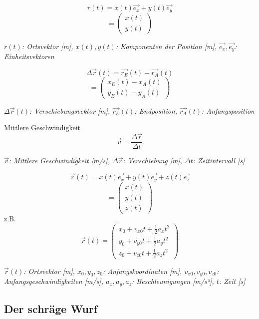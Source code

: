 \documentclass[a4paper,10pt]{article}
\newenvironment{displayformula}
{
	\begin{framed}
		\color{formulaColor}
	}
	{\end{framed}}
\newcommand{\formulalegend}[1]{%
	\par\vspace{0.5ex}%
	{{\color{legendColor}\RaggedRight\small\textit{#1}}}%
	\par\vspace{1.5ex}%
}
\begin{document}
\begin{displayformula}
	\[
	r(t) = x(t)\vec{e_x} + y(t)\vec{e_y}
	\]
	\[
	= \begin{pmatrix}
		x(t) \\
		y(t)
	\end{pmatrix}
	\]
\end{displayformula}
\formulalegend{
	\( r(t) \): Ortsvektor [m], \( x(t), y(t) \): Komponenten der Position [m], \( \vec{e_x}, \vec{e_y} \): Einheitsvektoren
}

\begin{displayformula}
	\[
	\Delta \vec{r}(t) = \vec{r_E}(t) - \vec{r_A}(t)
	\]
	\[
	= \begin{pmatrix}
		x_E(t) - x_A(t) \\
		y_E(t) - y_A(t)
	\end{pmatrix}
	\]
\end{displayformula}
\formulalegend{
	\( \Delta \vec{r}(t) \): Verschiebungsvektor [m], \( \vec{r_E}(t) \): Endposition, \( \vec{r_A}(t) \): Anfangsposition
}

\begin{displayformula}
	Mittlere Geschwindigkeit
	\[
	\vec{v} = \frac{\Delta \vec{r}}{\Delta t}
	\]
\end{displayformula}
\formulalegend{
	\( \vec{v} \): Mittlere Geschwindigkeit [m/s], \( \Delta \vec{r} \): Verschiebung [m], \( \Delta t \): Zeitintervall [s]
}

\begin{displayformula}
	\[
	\vec{r}(t) = x(t)\vec{e_x} + y(t)\vec{e_y} + z(t)\vec{e_z}
	\]
	\[
	=
	\begin{pmatrix}
		x(t)\\
		y(t) \\
		z(t)
	\end{pmatrix}
	\]
	z.B.
	\[
	\vec{r}(t) = \begin{pmatrix}
		x_0 + v_{x0}t + \frac{1}{2}a_x t^2 \\
		y_0 + v_{y0}t + \frac{1}{2}a_y t^2 \\
		z_0 + v_{z0}t + \frac{1}{2}a_z t^2 
	\end{pmatrix}
	\]
\end{displayformula}
\formulalegend{
	\( \vec{r}(t) \): Ortsvektor [m], \( x_0, y_0, z_0 \): Anfangskoordinaten [m], \( v_{x0}, v_{y0}, v_{z0} \): Anfangsgeschwindigkeiten [m/s], \( a_x, a_y, a_z \): Beschleunigungen [m/s²], \( t \): Zeit [s]
}


\subsection{Der schräge Wurf}
\end{document}
